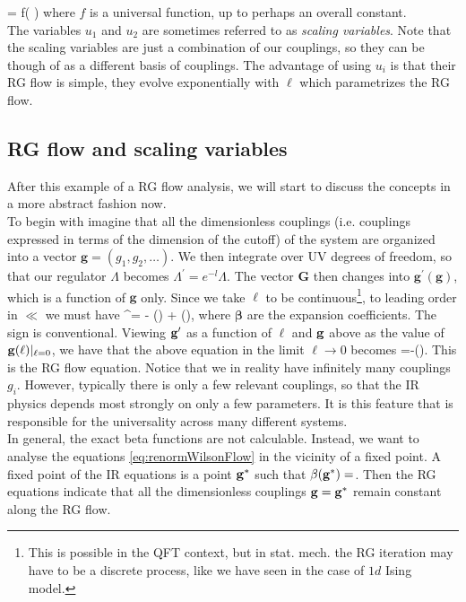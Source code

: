 \be
\xi =  f\left( \right)
\ee 
where $f$ is a universal function, up to perhaps an overall constant.\\
The variables $u_1$ and $u_2$ are sometimes referred to as \emph{scaling variables}. Note that the scaling variables are just a combination of our couplings, so they can be though of as a different basis of couplings. The advantage of using $u_i$ is that their RG flow is simple, they evolve exponentially with $\ell$ which parametrizes the RG flow.



\subsection{RG flow and scaling variables}
After this example of a RG flow analysis, we will start to discuss the concepts in a more abstract fashion now.\\
To begin with imagine that all the dimensionless couplings (i.e. couplings expressed in terms of the dimension of the cutoff) of the system are organized into a vector $\mathbf{g}=(g_1,g_2,\dots)$. We then integrate over UV degrees of freedom, so that our regulator $\Lambda$ becomes $\Lambda^\prime = e^{-l} \Lambda$. The vector $\mathbf{G}$ then changes into $\mathbf{g}^\prime(\mathbf{g})$, which is a function of $\mathbf{g}$ only. Since we take $\ell$ to be continuous\footnote{This is possible in the QFT context, but in stat. mech. the RG iteration may have to be a discrete process, like we have seen in the case of $1d$ Ising model.}, to leading order in $\ll$ we must  have
\be 
\label{eq:renormWilsonFlow}
^\prime =  - \ell \mathbf{\beta}(\mathg) + \mO(\ell),
\ee 
where $\mathbf{\beta}$ are the expansion coefficients. The sign is conventional. Viewing $\mathbf{g}^\prime$ as a function of $\ell$ and $\mathbf{g}$ above as the value of $\mathbf{g}(\ell)|_{\ell=0}$, we have that the above equation in the limit $\ell \rightarrow 0$ becomes
\be 
\frac{\md \mathg}{\md \ell } =-\vec{\beta}(\mathg).
\ee
This is the RG flow equation. Notice that we in reality have infinitely many couplings $g_i$. However, typically there is only a few relevant couplings, so that the IR physics depends most strongly on only a few parameters. It is this feature that is responsible for the universality across many different systems.\\
In general, the exact beta functions are not calculable. Instead, we want to analyse the equations \ref{eq:renormWilsonFlow} in the vicinity of a fixed point. A fixed point of the IR equations is a point $\mathbf{g}^*$ such that $\beta(\mathbf{g}^*)=$. Then the RG equations indicate that all the dimensionless couplings $\mathbf{g}=\mathbf{g}^*$ remain constant along the RG flow.\\
